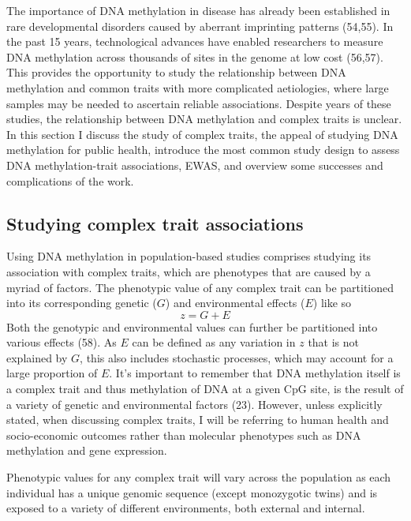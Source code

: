 \documentclass[11pt,twoside]{bristolthesis}
\begin{document}
The importance of DNA methylation in disease has already been established in rare developmental disorders caused by aberrant imprinting patterns (54,55). In the past 15 years, technological advances have enabled researchers to measure DNA methylation across thousands of sites in the genome at low cost (56,57). This provides the opportunity to study the relationship between DNA methylation and common traits with more complicated aetiologies, where large samples may be needed to ascertain reliable associations. Despite years of these studies, the relationship between DNA methylation and complex traits is unclear. In this section I discuss the study of complex traits, the appeal of studying DNA methylation for public health, introduce the most common study design to assess DNA methylation-trait associations, EWAS, and overview some successes and complications of the work.

\hypertarget{studying-complex-trait-associations}{%
\subsection{Studying complex trait associations}\label{studying-complex-trait-associations}}

Using DNA methylation in population-based studies comprises studying its association with complex traits, which are phenotypes that are caused by a myriad of factors. The phenotypic value of any complex trait can be partitioned into its corresponding genetic (\(G\)) and environmental effects (\(E\)) like so
\begin{equation}
    z = G + E
    \label{eq:phenotypic-values}
\end{equation}
Both the genotypic and environmental values can further be partitioned into various effects (58). As \(E\) can be defined as any variation in \(z\) that is not explained by \(G\), this also includes stochastic processes, which may account for a large proportion of \(E\). It's important to remember that DNA methylation itself is a complex trait and thus methylation of DNA at a given CpG site, is the result of a variety of genetic and environmental factors (23). However, unless explicitly stated, when discussing complex traits, I will be referring to human health and socio-economic outcomes rather than molecular phenotypes such as DNA methylation and gene expression.

Phenotypic values for any complex trait will vary across the population as each individual has a unique genomic sequence (except monozygotic twins) and is exposed to a variety of different environments, both external and internal.
\end{document}
